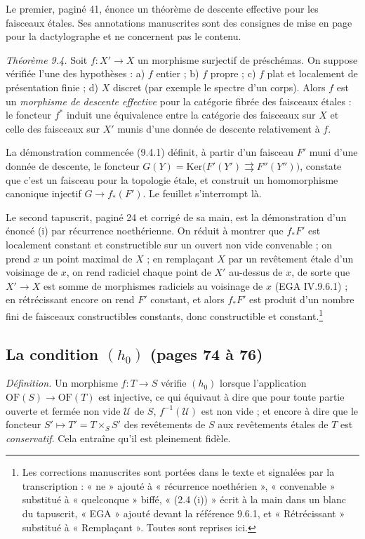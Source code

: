 \documentclass[11pt,a4paper]{article}
\begin{document}
Le premier, paginé 41, énonce un théorème de descente effective pour les
faisceaux étales. Ses annotations manuscrites sont des consignes de mise en page
pour la dactylographe et ne concernent pas le contenu.

\emph{Théorème 9.4.} Soit $f : X' \to X$ un morphisme surjectif de préschémas.
On suppose vérifiée l'une des hypothèses : a) $f$ entier ; b) $f$ propre ; c)
$f$ plat et localement de présentation finie ; d) $X$ discret (par exemple le
spectre d'un corps). Alors $f$ est un \emph{morphisme de descente effective}
pour la catégorie fibrée des faisceaux étales : le foncteur $f^{*}$ induit une
équivalence entre la catégorie des faisceaux sur $X$ et celle des faisceaux sur
$X'$ munis d'une donnée de descente relativement à $f$.

La démonstration commencée (9.4.1) définit, à partir d'un faisceau $F'$ muni
d'une donnée de descente, le foncteur $G(Y) = \mathrm{Ker}\bigl(F'(Y')
\rightrightarrows F''(Y'')\bigr)$, constate que c'est un faisceau pour la
topologie étale, et construit un homomorphisme canonique injectif $G \to
f_{*}(F')$. Le feuillet s'interrompt là.

Le second tapuscrit, paginé 24 et corrigé de sa main, est la démonstration d'un
énoncé (i) par récurrence noethérienne. On réduit à montrer que $f_{*}F'$ est
localement constant et constructible sur un ouvert non vide convenable ; on
prend $x$ un point maximal de $X$ ; en remplaçant $X$ par un revêtement étale
d'un voisinage de $x$, on rend radiciel chaque point de $X'$ au-dessus de $x$,
de sorte que $X' \to X$ est somme de morphismes radiciels au voisinage de $x$
(EGA IV.9.6.1) ; en rétrécissant encore on rend $F'$ constant, et alors
$f_{*}F'$ est produit d'un nombre fini de faisceaux constructibles constants,
donc constructible et constant.\footnote{Les corrections manuscrites sont
portées dans le texte et signalées par la transcription : « ne » ajouté à
« récurrence noethérien », « convenable » substitué à « quelconque » biffé,
« (2.4 (i)) » écrit à la main dans un blanc du tapuscrit, « EGA » ajouté devant
la référence 9.6.1, et « Rétrécissant » substitué à « Remplaçant ». Toutes sont
reprises ici.}

\subsection*{La condition $(h_{0})$ (pages 74 à 76)}

\emph{Définition.} Un morphisme $f : T \to S$ vérifie $(h_{0})$ lorsque
l'application $\mathrm{OF}(S) \to \mathrm{OF}(T)$ est injective, ce qui équivaut
à dire que pour toute partie ouverte et fermée non vide $\mathcal{U}$ de $S$,
$f^{-1}(\mathcal{U})$ est non vide ; et encore à dire que le foncteur $S'
\mapsto T' = T \times_{S} S'$ des revêtements de $S$ aux revêtements étales de
$T$ est \emph{conservatif}. Cela entraîne qu'il est pleinement fidèle.
\end{document}
